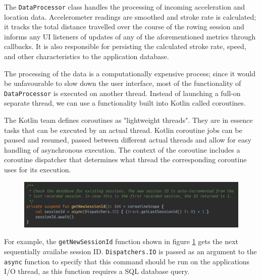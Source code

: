 \documentclass[11pt,twoside,a4paper]{report}
\begin{document}
The \texttt{DataProcessor} class handles the processing of incoming acceleration and location data. Accelerometer readings are smoothed and stroke rate is calculated; it tracks the total distance travelled over the course of the rowing session and informs any UI listeners of updates of any of the aforementioned metrics through callbacks. It is also responsible for persisting the calculated stroke rate, speed, and other characteristics to the application database.

The processing of the data is a computationally expensive process; since it would be unfavourable to slow down the user interface, most of the functionality of \texttt{DataProcessor} is executed on another thread. Instead of launching a full-on separate thread, we can use a functionality built into Kotlin called coroutines. 

The Kotlin team defines coroutines as "lightweight threads". They are in essence tasks that can be executed by an actual thread. Kotlin coroutine jobs can be paused and resumed, passed between different actual threads and allow for easy handling of asynchronous execution. The context of the coroutine includes a coroutine dispatcher that determines what thread the corresponding coroutine uses for its execution.\cite{kotlin_dispatchers}

\begin{figure}[h!]
  \centering
  \includegraphics[width=1.0\textwidth]{code-dataProcessor-getSessionId.png}
  \caption{}
  \label{fig:dataProcessorGetSessionId}
\end{figure}

For example, the \texttt{getNewSessionId} function shown in figure \ref{fig:dataProcessorGetSessionId} gets the next sequentially availabe session ID. \texttt{Dispatchers.IO} is passed as an argument to the \texttt{async} function to specify that this command should be run on the applications I/O thread, as this function requires a SQL database query.
\end{document}
